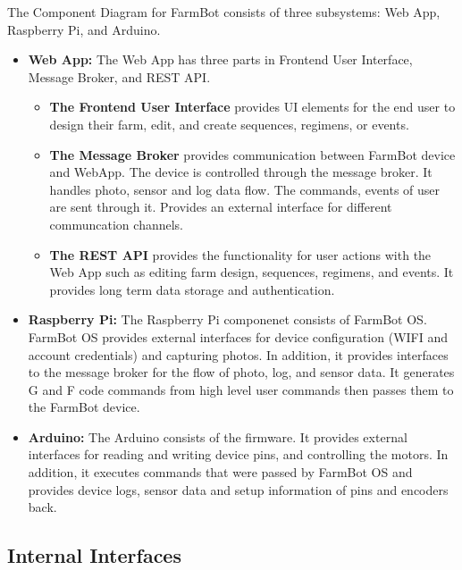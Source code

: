 The Component Diagram for FarmBot consists of three subsystems: Web App, Raspberry Pi, and Arduino.
\begin{itemize}
    \item \textbf{Web App:} The Web App has three parts in Frontend User Interface, Message Broker, and REST API. 
    \begin{itemize}
        \item \textbf{The Frontend User Interface} provides UI elements for the end user to design their farm, edit, and create sequences, regimens, or events.
        \item \textbf{The Message Broker} provides communication between FarmBot device and WebApp. The device is controlled through the message broker. It handles photo, sensor and log data flow. The commands, events of user are sent through it. Provides an external interface for different communcation channels.
        \item \textbf{The REST API} provides the functionality for user actions with the Web App such as editing farm design, sequences, regimens, and events. It provides long term data storage and authentication. 
    \end{itemize}
    \item \textbf{Raspberry Pi:} The Raspberry Pi componenet consists of FarmBot OS. FarmBot OS provides external interfaces for device configuration (WIFI and account credentials) and capturing photos. In addition, it provides interfaces to the message broker for the flow of photo, log, and sensor data. It generates G and F code commands from high level user commands then passes them to the FarmBot device.
    \item \textbf{Arduino:} The Arduino consists of the firmware. It provides external interfaces for reading and writing device pins, and controlling the motors. In addition, it executes commands that were passed by FarmBot OS and provides device logs, sensor data and setup information of pins and encoders back.
    
\end{itemize}

\subsection{Internal Interfaces}

